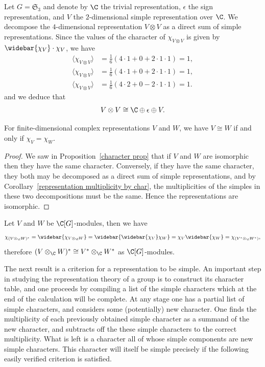 \begin{example}
Let $G=\mathfrak{S}_3$ and denote by $\C$ the trivial representation, $\epsilon$ the sign representation, and $V$ the $2$-dimensional simple representation over $\C$. We decompose the $4$-dimensional representation $V\otimes V$ as a direct sum of simple representations. Since the values of the character of $\chi_{V\otimes V}$ is given by $\widebar{\chi_V}\cdot\chi_V$, we have
\begin{align*}
\langle\chi_{V\otimes V}\rangle&=\frac{1}{6}(4\cdot 1+0+2\cdot 1\cdot 1)=1,\\
\langle\chi_{V\otimes V}\rangle&=\frac{1}{6}(4\cdot 1+0+2\cdot 1\cdot 1)=1,\\
\langle\chi_{V\otimes V}\rangle&=\frac{1}{6}(4\cdot 2+0-2\cdot 1\cdot 1)=1.
\end{align*}
and we deduce that
\[V\otimes V\cong\C\oplus\epsilon\oplus V.\]
\end{example}
\begin{corollary}\label{representation isomorphic iff char}
For finite-dimensional complex representations $V$ and $W$, we have $V\cong W$ if and only if $\chi_V=\chi_W$.
\end{corollary}
\begin{proof}
We saw in Proposition~\ref{character prop} that if $V$ and $W$ are isomorphic then they have the same character. Conversely, if they have the same character, they both may be decomposed as a direct sum of simple representations, and by Corollary~\ref{representation multiplicity by char}, the multiplicities of the simples in these two decompositions must be the same. Hence the representations are isomorphic.
\end{proof}
\begin{example}
Let $V$ and $W$ be $\C[G]$-modules, then we have
\[\chi_{(V\otimes_{\C}W)^*}=\widebar{\chi_{V\otimes_{\C}W}}=\widebar{\widebar{\chi_V}\chi_W}=\chi_{V}\widebar{\chi_W}=\chi_{(V^*\otimes_{\C}W^*)},\]
therefore $(V\otimes_{\C}W)^*\cong V^*\otimes_{\C}W^*$ as $\C[G]$-modules.
\end{example}
The next result is a criterion for a representation to be simple. An important step in studying the representation theory of a group is to construct its character table, and one proceeds by compiling a list of the simple characters which at the end of the calculation will be complete. At any stage one has a partial list of simple characters, and considers some (potentially) new character. One finds the multiplicity of each previously obtained simple character as a summand of the new character, and subtracts off the these simple characters to the correct multiplicity. What is left is a character all of whose simple components are new simple characters. This character will itself be simple precisely if the following easily verified criterion is satisfied.
